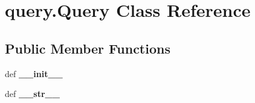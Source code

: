 \hypertarget{classquery_1_1Query}{\section{query.\-Query Class Reference}
\label{classquery_1_1Query}
}
\subsection*{Public Member Functions}
\begin{DoxyCompactItemize}
\item 
\hypertarget{classquery_1_1Query_a03c16181d9ce65cb7264b029b432fe7b}{def {\bfseries \-\_\-\-\_\-init\-\_\-\-\_\-}}\label{classquery_1_1Query_a03c16181d9ce65cb7264b029b432fe7b}

\item 
\hypertarget{classquery_1_1Query_ac58e18c6ba0209b084cb24c0dd9f2b3a}{def {\bfseries \-\_\-\-\_\-str\-\_\-\-\_\-}}\label{classquery_1_1Query_ac58e18c6ba0209b084cb24c0dd9f2b3a}

\end{DoxyCompactItemize}
